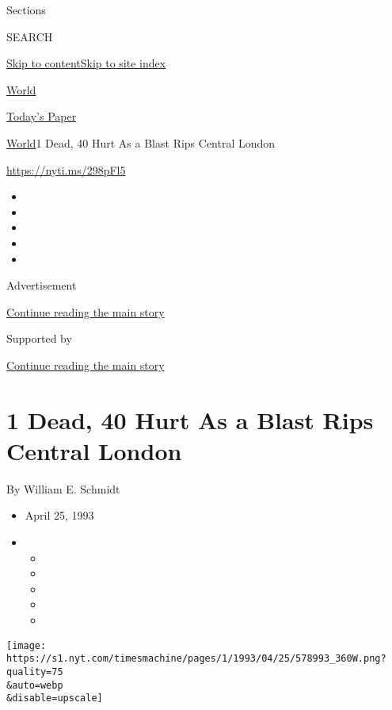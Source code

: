 Sections

SEARCH

\protect\hyperlink{site-content}{Skip to
content}\protect\hyperlink{site-index}{Skip to site index}

\href{https://www.nytimes.com/section/world}{World}

\href{https://myaccount.nytimes.com/auth/login?response_type=cookie\&client_id=vi}{}

\href{https://www.nytimes.com/section/todayspaper}{Today's Paper}

\href{/section/world}{World}\textbar{}1 Dead, 40 Hurt As a Blast Rips
Central London

\url{https://nyti.ms/298pFl5}

\begin{itemize}
\item
\item
\item
\item
\item
\end{itemize}

Advertisement

\protect\hyperlink{after-top}{Continue reading the main story}

Supported by

\protect\hyperlink{after-sponsor}{Continue reading the main story}

\hypertarget{1-dead-40-hurt-as-a-blast-rips-central-london}{%
\section{1 Dead, 40 Hurt As a Blast Rips Central
London}\label{1-dead-40-hurt-as-a-blast-rips-central-london}}

By William E. Schmidt

\begin{itemize}
\item
  April 25, 1993
\item
  \begin{itemize}
  \item
  \item
  \item
  \item
  \item
  \end{itemize}
\end{itemize}

\texttt{[image: https://s1.nyt.com/timesmachine/pages/1/1993/04/25/578993\_360W.png?quality=75\\\&auto=webp\\\&disable=upscale]}


